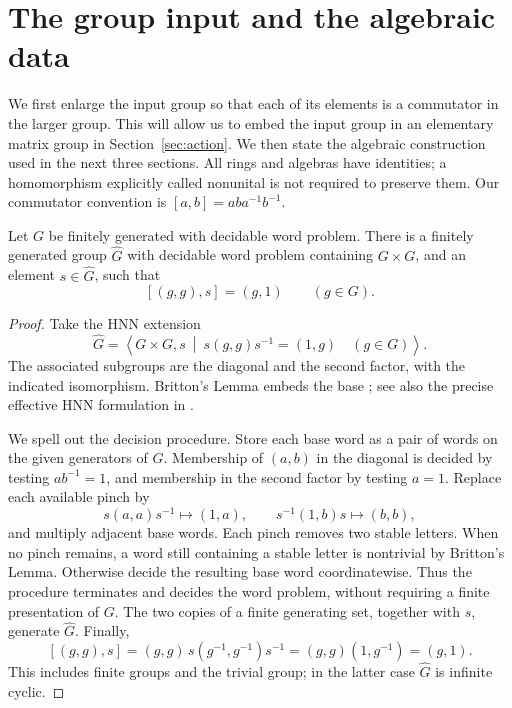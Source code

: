 \section{The group input and the algebraic data}\label{sec:reduction}

We first enlarge the input group so that each of its elements is a
commutator in the larger group. This will allow us to embed the input
group in an elementary matrix group in Section~\ref{sec:action}.
We then state the algebraic construction used in the next three
sections. All rings and algebras have identities; a homomorphism
explicitly called nonunital is not required to preserve them.
Our commutator convention is \([a,b]=aba^{-1}b^{-1}\).

\begin{lemma}\label{lem:group-input}
Let \(G\) be finitely generated with decidable word problem. There is a
finitely generated group \(\widehat G\) with decidable word problem
containing \(G\times G\), and an element \(s\in\widehat G\), such that
\[
 [(g,g),s]=(g,1)\qquad(g\in G).
\]
\end{lemma}
\begin{proof}
Take the HNN extension
\[
 \widehat G=
 \left\langle G\times G,s\ \middle|\
 s(g,g)s^{-1}=(1,g)\quad(g\in G)\right\rangle .
\]
The associated subgroups are the diagonal and the second factor, with
the indicated isomorphism. Britton's Lemma embeds the base
\cite{Britton63}; see also the precise effective HNN formulation in
\cite[p.~44]{BH74}.

We spell out the decision procedure. Store each base word as a pair of
words on the given generators of \(G\). Membership of \((a,b)\) in the
diagonal is decided by testing \(ab^{-1}=1\), and membership in the second
factor by testing \(a=1\). Replace each available pinch by
\[
 s(a,a)s^{-1}\longmapsto(1,a),
 \qquad
 s^{-1}(1,b)s\longmapsto(b,b),
\]
and multiply adjacent base words. Each pinch removes two stable letters.
When no pinch remains, a word still containing a stable letter is
nontrivial by Britton's Lemma. Otherwise decide the resulting base word
coordinatewise. Thus the procedure terminates and decides the word
problem, without requiring a finite presentation of \(G\).
The two copies of a finite generating set, together with \(s\), generate
\(\widehat G\). Finally,
\[
 [(g,g),s]=(g,g)\,s(g^{-1},g^{-1})s^{-1}
           =(g,g)(1,g^{-1})=(g,1).
\]
This includes finite groups and the trivial group; in the latter case
\(\widehat G\) is infinite cyclic.
\end{proof}

